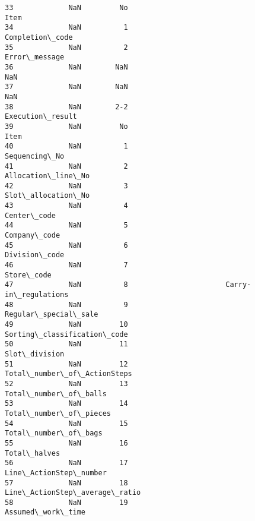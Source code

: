 \documentclass[11pt]{article}
\begin{document}
\begin{Verbatim}[commandchars=\\\{\}]
33             NaN         No                                       Item
34             NaN          1                            Completion\_code
35             NaN          2                              Error\_message
36             NaN        NaN                                        NaN
37             NaN        NaN                                        NaN
38             NaN        2-2                           Execution\_result
39             NaN         No                                       Item
40             NaN          1                              Sequencing\_No
41             NaN          2                         Allocation\_line\_No
42             NaN          3                         Slot\_allocation\_No
43             NaN          4                                Center\_code
44             NaN          5                               Company\_code
45             NaN          6                              Division\_code
46             NaN          7                                 Store\_code
47             NaN          8                       Carry-in\_regulations
48             NaN          9                       Regular\_special\_sale
49             NaN         10                Sorting\_classification\_code
50             NaN         11                              Slot\_division
51             NaN         12                Total\_number\_of\_ActionSteps
52             NaN         13                      Total\_number\_of\_balls
53             NaN         14                     Total\_number\_of\_pieces
54             NaN         15                       Total\_number\_of\_bags
55             NaN         16                               Total\_halves
56             NaN         17                     Line\_ActionStep\_number
57             NaN         18              Line\_ActionStep\_average\_ratio
58             NaN         19                          Assumed\_work\_time


\end{Verbatim}
\end{document}
